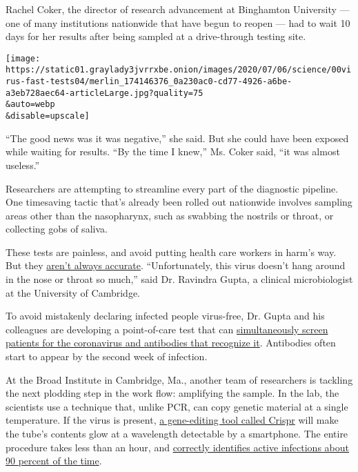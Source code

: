 Rachel Coker, the director of research advancement at Binghamton
University --- one of many institutions nationwide that have begun to
reopen --- had to wait 10 days for her results after being sampled at a
drive-through testing site.

\texttt{[image: https://static01.graylady3jvrrxbe.onion/images/2020/07/06/science/00virus-fast-tests04/merlin\_174146376\_0a230ac0-cd77-4926-a6be-a3eb728aec64-articleLarge.jpg?quality=75\\\&auto=webp\\\&disable=upscale]}

``The good news was it was negative,'' she said. But she could have been
exposed while waiting for results. ``By the time I knew,'' Ms. Coker
said, ``it was almost useless.''

Researchers are attempting to streamline every part of the diagnostic
pipeline. One timesaving tactic that's already been rolled out
nationwide involves sampling areas other than the nasopharynx, such as
swabbing the nostrils or throat, or collecting gobs of saliva.

These tests are painless, and avoid putting health care workers in
harm's way. But they
\href{https://www.cebm.net/covid-19/comparative-accuracy-of-oropharyngeal-and-nasopharyngeal-swabs-for-diagnosis-of-covid-19/}{aren't
always accurate}. ``Unfortunately, this virus doesn't hang around in the
nose or throat so much,'' said Dr. Ravindra Gupta, a clinical
microbiologist at the University of Cambridge.

To avoid mistakenly declaring infected people virus-free, Dr. Gupta and
his colleagues are developing a point-of-care test that can
\href{https://www.medrxiv.org/content/10.1101/2020.06.16.20133157v3.full.pdf}{simultaneously
screen patients for the coronavirus and antibodies that recognize it}.
Antibodies often start to appear by the second week of infection.

At the Broad Institute in Cambridge, Ma., another team of researchers is
tackling the next plodding step in the work flow: amplifying the sample.
In the lab, the scientists use a technique that, unlike PCR, can copy
genetic material at a single temperature. If the virus is present,
\href{https://www.biorxiv.org/content/10.1101/2020.05.28.119131v1.full.pdf}{a
gene-editing tool called Crispr} will make the tube's contents glow at a
wavelength detectable by a smartphone. The entire procedure takes less
than an hour, and
\href{https://www.biorxiv.org/content/10.1101/2020.05.28.119131v1.full.pdf}{correctly
identifies active infections about 90 percent of the time}.

